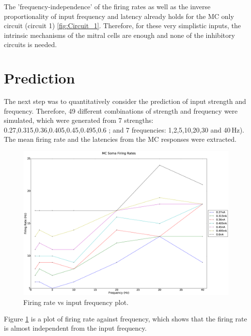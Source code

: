 \documentclass[11pt]{report}
\begin{document}
The 'frequency-independence' of the firing rates as well as the inverse proportionality of input frequency and latency already holds for the MC only circuit (circuit 1) \ref{fig:Circuit_1}. Therefore, for these very simplistic inputs, the intrinsic mechanisms of the mitral cells are enough and none of the inhibitory circuits is needed.

\section*{Prediction}
The next step was to quantitatively consider the prediction of input strength and frequency. Therefore, 49 different combinations of strength and frequency were simulated, which were generated from 7 strengths: 0.27,0.315,0.36,0.405,0.45,0.495,0.6 ; and 7 frequencies: 1,2,5,10,20,30 and 40\,Hz). The mean firing rate and the latencies from the MC responses were extracted.

\begin{figure}[!ht]
\centering
\includegraphics[width=\textwidth]{Figures/MC_Soma_firing_rate_circuit_4}
\caption{Firing rate vs input frequency plot.}
\label{fig:frate-freq}
\end{figure}

Figure \ref{fig:frate-freq} is a plot of firing rate against frequency, which shows that the firing rate is almost independent from the input frequency.
\end{document}

